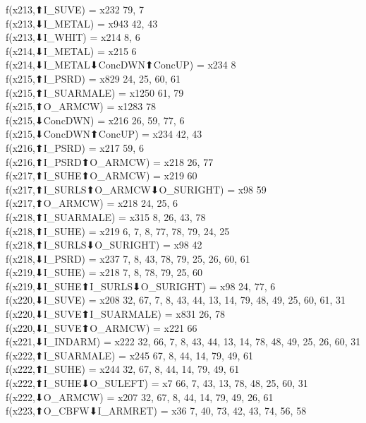 f(x213,⬆I_SUVE) = x232 {79, 7} \\
f(x213,⬇I_METAL) = x943 {42, 43} \\
f(x213,⬇I_WHIT) = x214 {8, 6} \\
f(x214,⬇I_METAL) = x215 {6} \\
f(x214,⬇I_METAL⬇ConcDWN⬆ConcUP) = x234 {8} \\
f(x215,⬆I_PSRD) = x829 {24, 25, 60, 61} \\
f(x215,⬆I_SUARMALE) = x1250 {61, 79} \\
f(x215,⬆O_ARMCW) = x1283 {78} \\
f(x215,⬇ConcDWN) = x216 {26, 59, 77, 6} \\
f(x215,⬇ConcDWN⬆ConcUP) = x234 {42, 43} \\
f(x216,⬆I_PSRD) = x217 {59, 6} \\
f(x216,⬆I_PSRD⬆O_ARMCW) = x218 {26, 77} \\
f(x217,⬆I_SUHE⬆O_ARMCW) = x219 {60} \\
f(x217,⬆I_SURLS⬆O_ARMCW⬇O_SURIGHT) = x98 {59} \\
f(x217,⬆O_ARMCW) = x218 {24, 25, 6} \\
f(x218,⬆I_SUARMALE) = x315 {8, 26, 43, 78} \\
f(x218,⬆I_SUHE) = x219 {6, 7, 8, 77, 78, 79, 24, 25} \\
f(x218,⬆I_SURLS⬇O_SURIGHT) = x98 {42} \\
f(x218,⬇I_PSRD) = x237 {7, 8, 43, 78, 79, 25, 26, 60, 61} \\
f(x219,⬇I_SUHE) = x218 {7, 8, 78, 79, 25, 60} \\
f(x219,⬇I_SUHE⬆I_SURLS⬇O_SURIGHT) = x98 {24, 77, 6} \\
f(x220,⬇I_SUVE) = x208 {32, 67, 7, 8, 43, 44, 13, 14, 79, 48, 49, 25, 60, 61, 31} \\
f(x220,⬇I_SUVE⬆I_SUARMALE) = x831 {26, 78} \\
f(x220,⬇I_SUVE⬆O_ARMCW) = x221 {66} \\
f(x221,⬇I_INDARM) = x222 {32, 66, 7, 8, 43, 44, 13, 14, 78, 48, 49, 25, 26, 60, 31} \\
f(x222,⬆I_SUARMALE) = x245 {67, 8, 44, 14, 79, 49, 61} \\
f(x222,⬆I_SUHE) = x244 {32, 67, 8, 44, 14, 79, 49, 61} \\
f(x222,⬆I_SUHE⬇O_SULEFT) = x7 {66, 7, 43, 13, 78, 48, 25, 60, 31} \\
f(x222,⬇O_ARMCW) = x207 {32, 67, 8, 44, 14, 79, 49, 26, 61} \\
f(x223,⬆O_CBFW⬇I_ARMRET) = x36 {7, 40, 73, 42, 43, 74, 56, 58} \\

